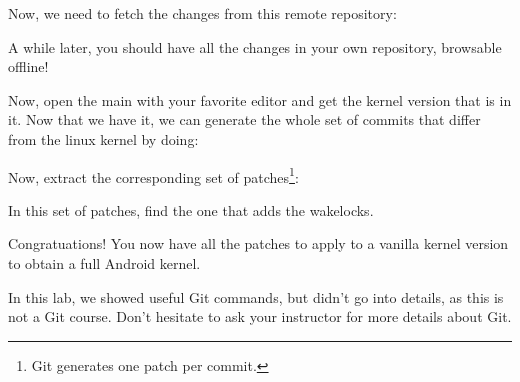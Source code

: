 Now, we need to fetch the changes from this remote repository:


A while later, you should have all the changes in your own repository, browsable
offline!

Now, open the main  with your favorite editor and get the kernel version
that is in it. Now that we have it, we can generate the whole set of commits that
differ from the linux kernel by doing:


Now, extract the corresponding set of patches\footnote{Git generates one patch per commit.}:


In this set of patches, find the one that adds the wakelocks.

Congratuations! You now have all the patches to apply to a vanilla kernel version to obtain a
full Android kernel.

In this lab, we showed useful Git commands, but didn't go into details, as this is not a Git course. Don't
hesitate to ask your instructor for more details about Git.
